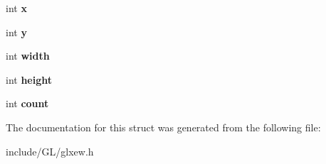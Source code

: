 \begin{DoxyCompactItemize}
int {\bfseries x}
\item 
\mbox{\label{structGLXPbufferClobberEvent_a69eb7ac60d36ac3ec4550ac206cfc61f}} 
int {\bfseries y}
\item 
\mbox{\label{structGLXPbufferClobberEvent_aaca375fecb872c73c60cd5d0bfc7c7a5}} 
int {\bfseries width}
\item 
\mbox{\label{structGLXPbufferClobberEvent_aed4e539c896bdad15217bf92c28f8520}} 
int {\bfseries height}
\item 
\mbox{\label{structGLXPbufferClobberEvent_a61e9f6b31738464dca67f909fcacd298}} 
int {\bfseries count}
\end{DoxyCompactItemize}


The documentation for this struct was generated from the following file\+:\begin{DoxyCompactItemize}
\item 
include/\+G\+L/glxew.\+h\end{DoxyCompactItemize}

